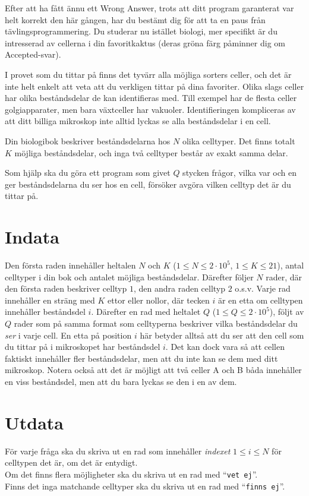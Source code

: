 Efter att ha fått ännu ett Wrong Answer, trots att ditt program garanterat var helt korrekt den här gången, har du bestämt dig för att ta en paus från tävlingsprogrammering.
Du studerar nu istället biologi, mer specifikt är du intresserad av cellerna i din favoritkaktus (deras gröna färg påminner dig om Accepted-svar).

I provet som du tittar på finns det tyvärr alla möjliga sorters celler, och det är inte helt enkelt att veta att du verkligen tittar på dina favoriter.
Olika slags celler har olika beståndsdelar de kan identifieras med.
Till exempel har de flesta celler golgiapparater, men bara växtceller har vakuoler.
Identifieringen kompliceras av att ditt billiga mikroskop inte alltid lyckas se alla beståndsdelar i en cell.

Din biologibok beskriver beståndsdelarna hos $N$ olika celltyper.
Det finns totalt $K$ möjliga beståndsdelar, och inga två celltyper består av exakt samma delar.

Som hjälp ska du göra ett program som givet $Q$ stycken frågor, vilka var och en ger beståndsdelarna du ser hos en cell, försöker avgöra vilken celltyp det är du tittar på.

\section*{Indata}
Den första raden innehåller heltalen $N$ och $K$ ($1 \leq N \leq 2 \cdot 10^5$, $1 \leq K \leq 21$), antal celltyper i din bok och antalet möjliga beståndsdelar.
Därefter följer $N$ rader, där den första raden beskriver celltyp $1$, den andra raden celltyp $2$ o.s.v.
Varje rad innehåller en sträng med $K$ ettor eller nollor, där tecken $i$ är en etta om celltypen innehåller beståndsdel $i$.
Därefter en rad med heltalet $Q$ ($1 \leq Q \leq 2\cdot 10^5$), följt av $Q$ rader som på samma format som celltyperna beskriver vilka beståndsdelar du \textit{ser} i varje cell.
En etta på position $i$ här betyder alltså att du ser att den cell som du tittar på i mikroskopet har beståndsdel $i$.
Det kan dock vara så att cellen faktiskt innehåller fler beståndsdelar, men att du inte kan se dem med ditt mikroskop.
Notera också att det är möjligt att två celler A och B båda innehåller en viss beståndsdel, men att du
bara lyckas se den i en av dem.

\section*{Utdata}
För varje fråga ska du skriva ut en rad som innehåller \textit{indexet} $1 \leq i \leq N$ för celltypen det är, om det är entydigt. \\
Om det finns flera möjligheter ska du skriva ut en rad med ``\texttt{vet ej}''. \\
Finns det inga matchande celltyper ska du skriva ut en rad med ``\texttt{finns ej}''.

